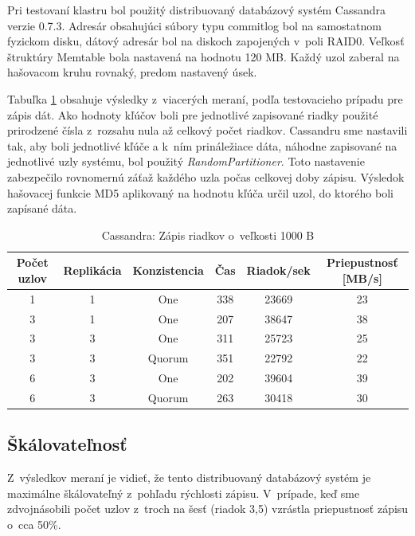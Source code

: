 \documentclass[11pt,twoside,a4paper]{book}
\begin{document}
Pri testovaní klastru bol použitý distribuovaný databázový systém Cassandra verzie 0.7.3. Adresár obsahujúci súbory typu commitlog bol na samostatnom fyzickom disku, dátový adresár bol na diskoch zapojených v~poli RAID0. Veľkosť štruktúry Memtable bola nastavená na hodnotu 120 MB. Každý uzol zaberal na hašovacom kruhu rovnaký, predom nastavený úsek.

Tabuľka \ref{tab:CPerf2} obsahuje výsledky z~viacerých meraní, podľa testovacieho prípadu pre zápis dát. Ako hodnoty kľúčov boli pre jednotlivé zapisované riadky použité prirodzené čísla z~rozsahu nula až celkový počet riadkov. Cassandru sme nastavili tak, aby boli jednotlivé kľúče a k~ním prináležiace dáta, náhodne zapisované na jednotlivé uzly systému, bol použitý \emph{RandomPartitioner}. Toto nastavenie zabezpečilo rovnomernú záťaž každého uzla počas celkovej doby zápisu. Výsledok hašovacej funkcie MD5 aplikovaný na hodnotu kľúča určil uzol, do ktorého boli zapísané dáta.

\begin{table}[hp]
\begin{center}
\begin{tabular}{|c|c|c|c|c|c|}
\hline Počet uzlov & Replikácia & Konzistencia & Čas & Riadok/sek & Priepustnosť [MB/s]\\ 
\hline
\hline 1 & 1 & One & 338 & 23669 & 23\\ 
\hline 3 & 1 & One & 207 & 38647 & 38\\ 
\hline 3 & 3 & One & 311 & 25723 & 25\\ 
\hline 3 & 3 & Quorum & 351 & 22792 & 22\\ 
\hline 6 & 3 & One & 202 & 39604 & 39\\ 
\hline 6 & 3 & Quorum & 263 & 30418 & 30\\ 
\hline
\end{tabular} 
\end{center}
\caption{Cassandra: Zápis riadkov o~veľkosti 1000 B}
\label{tab:CPerf2}
\end{table}

\subsection*{Škálovateľnosť}

Z~výsledkov meraní je vidieť, že tento distribuovaný databázový systém je maximálne škálovateľný z~pohľadu rýchlosti zápisu. V~prípade, keď sme zdvojnásobili počet uzlov z~troch na šesť (riadok 3,5) vzrástla priepustnosť zápisu o~cca 50\%.
\end{document}
